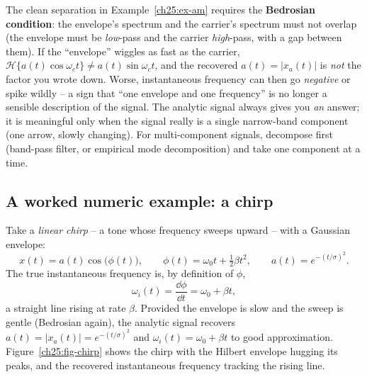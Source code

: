 \begin{trapbox}
The clean separation in Example~\ref{ch25:ex-am} requires the \textbf{Bedrosian condition}:
the envelope's spectrum and the carrier's spectrum must not overlap (the envelope must be
\emph{low}-pass and the carrier \emph{high}-pass, with a gap between them). If the
``envelope'' wiggles as fast as the carrier, $\mathcal{H}\{a(t)\cos\omega_c t\}\neq
a(t)\sin\omega_c t$, and the recovered $a(t)=|x_a(t)|$ is \emph{not} the factor you wrote
down. Worse, instantaneous frequency can then go \emph{negative} or spike wildly -- a sign
that ``one envelope and one frequency'' is no longer a sensible description of the signal.
The analytic signal always gives you \emph{an} answer; it is meaningful only when the
signal really is a single narrow-band component (one arrow, slowly changing). For
multi-component signals, decompose first (band-pass filter, or empirical mode
decomposition) and take one component at a time.
\end{trapbox}

\subsection{A worked numeric example: a chirp}
\label{ch25:ex-chirp}

Take a \emph{linear chirp} -- a tone whose frequency sweeps upward -- with a Gaussian
envelope:
\begin{equation}
\label{ch25:chirp}
x(t) = a(t)\cos\!\big(\phi(t)\big),
\qquad
\phi(t) = \omega_0 t + \tfrac{1}{2}\beta t^2,
\qquad
a(t) = e^{-(t/\sigma)^2}.
\end{equation}
The true instantaneous frequency is, by definition of $\phi$,
\[
\omega_i(t) = \frac{\dd\phi}{\dd t} = \omega_0 + \beta t,
\]
a straight line rising at rate $\beta$. Provided the envelope is slow and the sweep is
gentle (Bedrosian again), the analytic signal recovers
$a(t)=|x_a(t)|=e^{-(t/\sigma)^2}$ and $\omega_i(t)=\omega_0+\beta t$ to good
approximation. Figure~\ref{ch25:fig-chirp} shows the chirp with the Hilbert envelope
hugging its peaks, and the recovered instantaneous frequency tracking the rising line.

